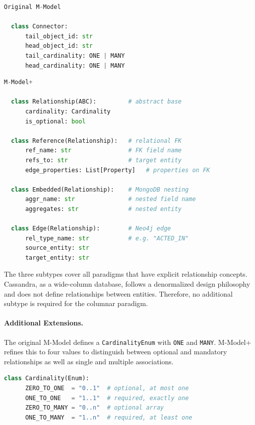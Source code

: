   \begin{lstlisting}[language=Python, basicstyle=\small\ttfamily]
  Original M-Model

  class Connector:
      tail_object_id: str
      head_object_id: str
      tail_cardinality: ONE | MANY
      head_cardinality: ONE | MANY
  \end{lstlisting}

  \begin{lstlisting}[language=Python, basicstyle=\small\ttfamily]
  M-Model+

  class Relationship(ABC):         # abstract base
      cardinality: Cardinality
      is_optional: bool

  class Reference(Relationship):   # relational FK
      ref_name: str                # FK field name
      refs_to: str                 # target entity
      edge_properties: List[Property]   # properties on FK

  class Embedded(Relationship):    # MongoDB nesting
      aggr_name: str               # nested field name
      aggregates: str              # nested entity

  class Edge(Relationship):        # Neo4j edge
      rel_type_name: str           # e.g. "ACTED_IN"
      source_entity: str
      target_entity: str
  \end{lstlisting}

  The three subtypes cover all paradigms that have explicit relationship concepts. Cassandra, as a wide-column database, follows a denormalized
  design philosophy and does not define relationships between entities. Therefore, no additional subtype is required for the columnar paradigm.


\paragraph{Additional Extensions.}
  The original M-Model defines a \texttt{CardinalityEnum} with \texttt{ONE} and \texttt{MANY}. M-Model+ refines this to four values to distinguish
  between optional and mandatory relationships as well as single and multiple associations.

  \begin{lstlisting}[language=Python, basicstyle=\small\ttfamily]
  class Cardinality(Enum):
      ZERO_TO_ONE  = "0..1"  # optional, at most one
      ONE_TO_ONE   = "1..1"  # required, exactly one
      ZERO_TO_MANY = "0..n"  # optional array
      ONE_TO_MANY  = "1..n"  # required, at least one
  \end{lstlisting}

